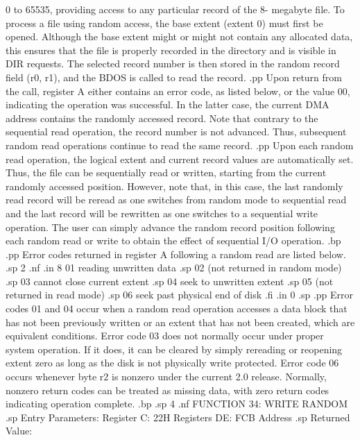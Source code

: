0 to 65535, providing access to any particular record of the 8-
megabyte file.  To process a file using random access, the base 
extent (extent 0) must first be opened.  Although the base extent 
might or might not contain any allocated data, this ensures that the 
file is properly recorded in the directory and is visible in DIR 
requests.  The selected record number is then stored in the 
random record field (r0, r1), and the BDOS is called to read the 
record.
.pp
Upon return from the call, register A either contains an error 
code, as listed below, or the value 00, indicating the operation 
was successful.  In the latter case, the current DMA address 
contains the randomly accessed record.  Note that
contrary to the sequential read operation, the record number is 
not advanced.  Thus, subsequent random read operations continue 
to read the same record.
.pp
Upon each random read operation, the logical extent and current 
record values are automatically set.  Thus, the file can be 
sequentially read or written, starting from the current randomly 
accessed position.  However, note that, in this 
case, the last randomly read record will be reread as one 
switches from random mode to sequential read and the last record 
will be rewritten as one switches to a sequential write operation.  
The user can simply advance the random record 
position following each random read or write to obtain the effect 
of sequential I/O operation.
.bp
.pp
Error codes returned in register A following a random read are 
listed below.
.sp 2
.nf
.in 8
01   reading unwritten data
.sp
02   (not returned in random mode)
.sp
03   cannot close current extent
.sp
04   seek to unwritten extent
.sp
05   (not returned in read mode)
.sp
06   seek past physical end of disk
.fi
.in 0
.sp
.pp
Error codes 01 and 04 occur when a random read operation accesses 
a data block that has not been previously written or an extent 
that has not been created, which are equivalent conditions.  
Error code 03 does not normally occur under proper system 
operation.  If it does, it can be cleared by simply rereading or 
reopening extent zero as long as the disk is not physically write 
protected.  Error code 06 occurs whenever byte r2 is nonzero 
under the current 2.0 release.  Normally, nonzero return codes 
can be treated as missing data, with zero return codes indicating 
operation complete.
.bp
.sp 4
.nf
                   FUNCTION 34:  WRITE RANDOM
.sp
                Entry Parameters:
                      Register C:  22H
                    Registers DE:  FCB Address
.sp
                Returned Value:
